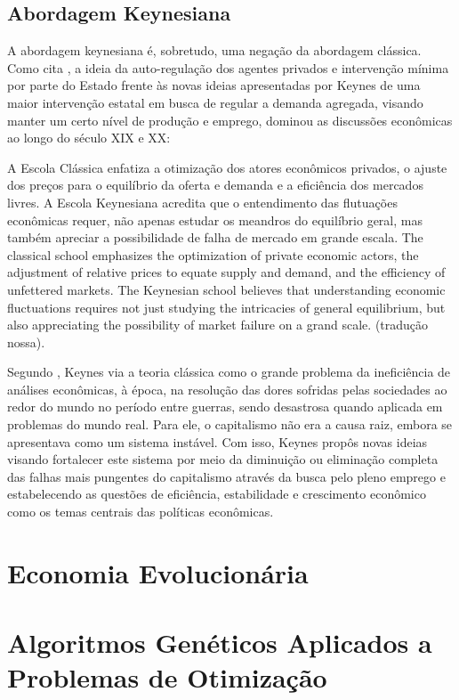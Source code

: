 \subsection{Abordagem Keynesiana}

A abordagem keynesiana é, sobretudo, uma negação da abordagem clássica. Como cita \citeauthor*{mankiw1989}, a ideia da auto-regulação dos agentes privados e intervenção mínima por parte do Estado frente às novas ideias apresentadas por Keynes de uma maior intervenção estatal em busca de regular a demanda agregada, visando manter um certo nível de produção e emprego, dominou as discussões econômicas ao longo do século XIX e XX:

\citacao
	{%
		A Escola Clássica enfatiza a otimização dos atores econômicos privados, o ajuste dos preços para o equilíbrio da oferta e demanda e a eficiência dos mercados livres. A Escola Keynesiana acredita que o entendimento das flutuações econômicas requer, não apenas estudar os meandros do equilíbrio geral, mas também apreciar a possibilidade de falha de mercado em grande escala.
	}{%
		The classical school emphasizes the optimization of private economic actors, the adjustment of relative prices to equate supply and demand, and the efficiency of unfettered markets. The Keynesian school believes that understanding economic fluctuations requires not just studying the intricacies of general equilibrium, but also appreciating the possibility of market failure on a grand scale.
	}
	{\citep[pg.79]{mankiw1989}}
	{(tradução nossa).}

Segundo , Keynes via a teoria clássica como o grande problema da ineficiência de análises econômicas, à época, na resolução das dores sofridas pelas sociedades ao redor do mundo no período entre guerras, sendo desastrosa quando aplicada em problemas do mundo real. Para ele, o capitalismo não era a causa raiz, embora se apresentava como um sistema instável. Com isso, Keynes propôs novas ideias visando fortalecer este sistema por meio da diminuição ou eliminação completa das falhas mais pungentes do capitalismo através da busca pelo pleno emprego e estabelecendo as questões de eficiência, estabilidade e crescimento econômico como os temas centrais das políticas econômicas.

\section{Economia Evolucionária}

\section{Algoritmos Genéticos Aplicados a Problemas de Otimização}
\label{subsec:AlgoritmosGeneticosAplicadosProblemasOtimizacao}

